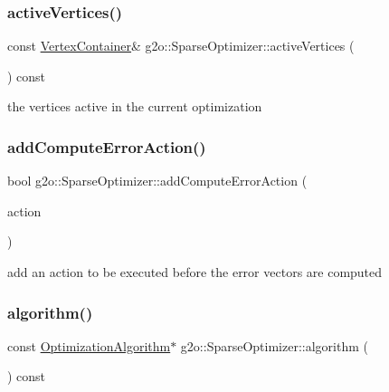 \subsubsection{\texorpdfstring{active\+Vertices()}{activeVertices()}}
{\footnotesize\ttfamily const \mbox{\hyperlink{structg2o_1_1_optimizable_graph_a54f01b9b6071e65e6abeebe4afb29dec}{Vertex\+Container}}\& g2o\+::\+Sparse\+Optimizer\+::active\+Vertices (\begin{DoxyParamCaption}{ }\end{DoxyParamCaption}) const\hspace{0.3cm}{\ttfamily [inline]}}



the vertices active in the current optimization 

\mbox{\label{classg2o_1_1_sparse_optimizer_a43517d9f9f23ba6041061c57dddd916d}} 
\subsubsection{\texorpdfstring{add\+Compute\+Error\+Action()}{addComputeErrorAction()}}
{\footnotesize\ttfamily bool g2o\+::\+Sparse\+Optimizer\+::add\+Compute\+Error\+Action (\begin{DoxyParamCaption}\item[{\mbox{\hyperlink{classg2o_1_1_hyper_graph_action}{Hyper\+Graph\+Action}} $\ast$}]{action }\end{DoxyParamCaption})}



add an action to be executed before the error vectors are computed 

\mbox{\label{classg2o_1_1_sparse_optimizer_aa08ce344e31a461426289a638b33332a}} 
\subsubsection{\texorpdfstring{algorithm()}{algorithm()}}
{\footnotesize\ttfamily const \mbox{\hyperlink{classg2o_1_1_optimization_algorithm}{Optimization\+Algorithm}}$\ast$ g2o\+::\+Sparse\+Optimizer\+::algorithm (\begin{DoxyParamCaption}{ }\end{DoxyParamCaption}) const\hspace{0.3cm}{\ttfamily [inline]}}



